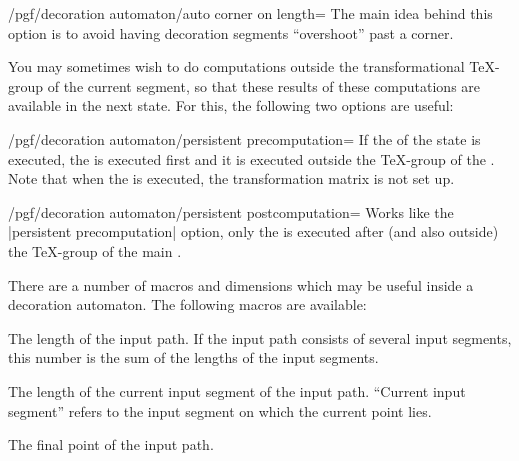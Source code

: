 \begin{command}{\pgfdeclaredecoration{}}
\begin{command}{\state{}}
\begin{key}{/pgf/decoration automaton/auto corner on length=}
            The main idea behind this option is to avoid having decoration
            segments ``overshoot'' past a corner.
        \end{key}

        You may sometimes wish to do computations outside the transformational
        \TeX-group of the current segment, so that these results of these
        computations are available in the next state. For this, the following
        two options are useful:

        \begin{key}{/pgf/decoration automaton/persistent precomputation=}
            If the  of the state is executed, the  is
            executed first and it is executed outside the \TeX-group of the
            . Note that when the  is executed, the
            transformation matrix is not set up.
        \end{key}

        \begin{key}{/pgf/decoration automaton/persistent postcomputation=}
            Works like the |persistent precomputation| option, only the
             is executed after (and also outside) the \TeX-group
            of the main .
        \end{key}

        There are a number of macros and dimensions which may be useful inside
        a decoration automaton. The following macros are available:

        \begin{command}{\pgfdecoratedpathlength}
            The length of the input path. If the input path consists of several
            input segments, this number is the sum of the lengths of the input
            segments.
        \end{command}

        \begin{command}{\pgfdecoratedinputsegmentlength}
            The length of the current input segment of the input path.
            ``Current input segment''  refers to the input segment on which the
            current point lies.
        \end{command}

        \begin{command}{\pgfpointdecoratedpathlast}
            The final point of the input path.
        \end{command}


\end{command}
\end{command}
